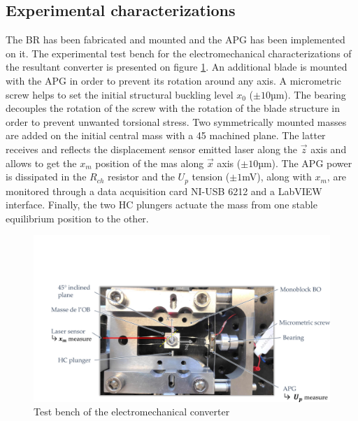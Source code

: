 \documentclass[3p,twocolumn,preprint]{elsarticle}
\begin{document}
	\subsection{Experimental characterizations}	
	\label{subsec:Experimental characterizations}
The BR has been fabricated and mounted and the APG has been implemented on it. The experimental test bench for the electromechanical characterizations of the resultant converter is presented on figure \ref{fig:BDT_OB+GPA}. An additional blade is mounted with the APG in order to prevent its rotation around any axis. A micrometric screw helps to set the initial structural buckling level $x_0$ ($\pm 10$µm). The bearing decouples the rotation of the screw with the rotation of the blade structure in order to prevent unwanted torsional stress. Two symmetrically mounted masses are added on the initial central mass with a 45\degree{} machined plane. The latter receives and reflects the displacement sensor emitted laser along the $\vec{z}$ axis and allows to get the $x_m$ position of the mas along $\vec{x}$ axis ($\pm 10$µm). The APG power is dissipated in the $R_{ch}$ resistor and the $U_p$ tension ($\pm 1$mV), along with $x_m$, are monitored through a data acquisition card NI-USB 6212 and a LabVIEW interface. Finally, the two HC plungers actuate the mass from one stable equilibrium position to the other.
\begin{figure}[!htbp]
	\centering
	\captionsetup{justification=centering}
	\includegraphics[trim={2cm 0cm 0cm 5.5cm},clip,width=\linewidth]{figures/BDT_OB+GPA.pdf}
	\caption{Test bench of the electromechanical converter}
	\label{fig:BDT_OB+GPA}
\end{figure}
\end{document}
